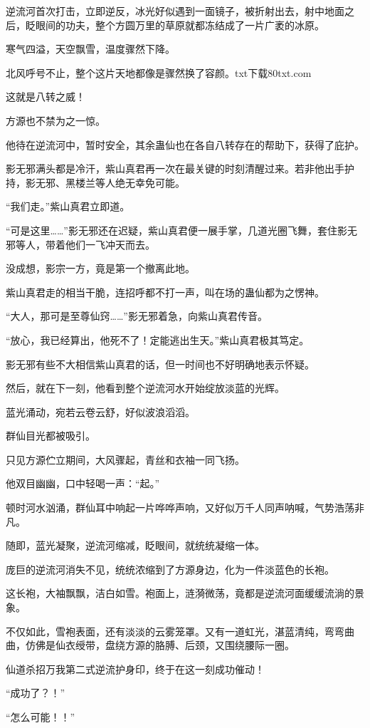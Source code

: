 \begin{this_body}
逆流河首次打击，立即逆反，冰光好似遇到一面镜子，被折射出去，射中地面之后，眨眼间的功夫，整个方圆万里的草原就都冻结成了一片广袤的冰原。

寒气四溢，天空飘雪，温度骤然下降。

北风呼号不止，整个这片天地都像是骤然换了容颜。txt下载80txt.com

这就是八转之威！

方源也不禁为之一惊。

他待在逆流河中，暂时安全，其余蛊仙也在各自八转存在的帮助下，获得了庇护。

影无邪满头都是冷汗，紫山真君再一次在最关键的时刻清醒过来。若非他出手护持，影无邪、黑楼兰等人绝无幸免可能。

“我们走。”紫山真君立即道。

“可是这里……”影无邪还在迟疑，紫山真君便一展手掌，几道光圈飞舞，套住影无邪等人，带着他们一飞冲天而去。

没成想，影宗一方，竟是第一个撤离此地。

紫山真君走的相当干脆，连招呼都不打一声，叫在场的蛊仙都为之愣神。

“大人，那可是至尊仙窍……”影无邪着急，向紫山真君传音。

“放心，我已经算出，他死不了！定能逃出生天。”紫山真君极其笃定。

影无邪有些不大相信紫山真君的话，但一时间也不好明确地表示怀疑。

然后，就在下一刻，他看到整个逆流河水开始绽放淡蓝的光辉。

蓝光涌动，宛若云卷云舒，好似波浪滔滔。

群仙目光都被吸引。

只见方源伫立期间，大风骤起，青丝和衣袖一同飞扬。

他双目幽幽，口中轻喝一声：“起。”

顿时河水汹涌，群仙耳中响起一片哗哗声响，又好似万千人同声呐喊，气势浩荡非凡。

随即，蓝光凝聚，逆流河缩减，眨眼间，就统统凝缩一体。

庞巨的逆流河消失不见，统统浓缩到了方源身边，化为一件淡蓝色的长袍。

这长袍，大袖飘飘，洁白如雪。袍面上，涟漪微荡，竟都是逆流河面缓缓流淌的景象。

不仅如此，雪袍表面，还有淡淡的云雾笼罩。又有一道虹光，湛蓝清纯，弯弯曲曲，仿佛是仙衣绶带，盘绕方源的胳膊、后颈，又围绕腰际一圈。

仙道杀招万我第二式逆流护身印，终于在这一刻成功催动！

“成功了？！”

“怎么可能！！”


\end{this_body}
